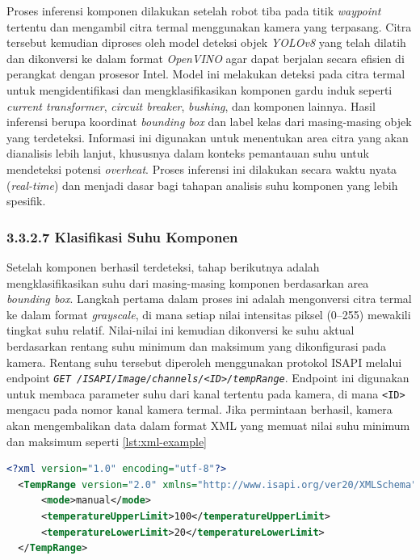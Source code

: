 Proses inferensi komponen dilakukan setelah robot tiba pada titik \emph{waypoint} tertentu dan mengambil citra termal menggunakan kamera yang terpasang. Citra tersebut kemudian diproses oleh model deteksi objek \emph{YOLOv8} yang telah dilatih dan dikonversi ke dalam format \emph{OpenVINO} agar dapat berjalan secara efisien di perangkat dengan prosesor Intel. Model ini melakukan deteksi pada citra termal untuk mengidentifikasi dan mengklasifikasikan komponen gardu induk seperti \emph{current transformer}, \emph{circuit breaker}, \emph{bushing}, dan komponen lainnya. Hasil inferensi berupa koordinat \emph{bounding box} dan label kelas dari masing-masing objek yang terdeteksi. Informasi ini digunakan untuk menentukan area citra yang akan dianalisis lebih lanjut, khususnya dalam konteks pemantauan suhu untuk mendeteksi potensi \emph{overheat}. Proses inferensi ini dilakukan secara waktu nyata (\emph{real-time}) dan menjadi dasar bagi tahapan analisis suhu komponen yang lebih spesifik.

\subsubsection{3.3.2.7 Klasifikasi Suhu Komponen}

Setelah komponen berhasil terdeteksi, tahap berikutnya adalah mengklasifikasikan suhu dari masing-masing komponen berdasarkan area \emph{bounding box}. Langkah pertama dalam proses ini adalah mengonversi citra termal ke dalam format \emph{grayscale}, di mana setiap nilai intensitas piksel (0--255) mewakili tingkat suhu relatif. Nilai-nilai ini kemudian dikonversi ke suhu aktual berdasarkan rentang suhu minimum dan maksimum yang dikonfigurasi pada kamera.
Rentang suhu tersebut diperoleh menggunakan protokol ISAPI melalui endpoint \texttt{\emph{GET /ISAPI/Image/channels/<ID>/tempRange}}. Endpoint ini digunakan untuk membaca parameter suhu dari kanal tertentu pada kamera, di mana \texttt{<ID>} mengacu pada nomor kanal kamera termal. Jika permintaan berhasil, kamera akan mengembalikan data dalam format XML yang memuat nilai suhu minimum dan maksimum seperti \ref{lst:xml-example}

\begin{lstlisting}[language=XML, caption={Contoh \emph{XML respone} dari enpoint ISAPI}, label={lst:xml-example}]
  <?xml version="1.0" encoding="utf-8"?>
  <TempRange version="2.0" xmlns="http://www.isapi.org/ver20/XMLSchema">
      <mode>manual</mode>
      <temperatureUpperLimit>100</temperatureUpperLimit>
      <temperatureLowerLimit>20</temperatureLowerLimit>
  </TempRange>
  \end{lstlisting}

